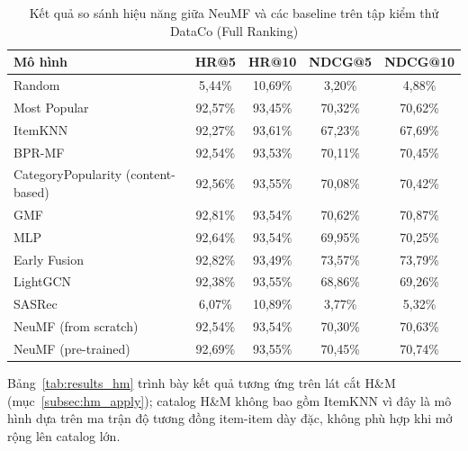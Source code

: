 \begin{table}[htbp]
    \centering
    \caption{Kết quả so sánh hiệu năng giữa NeuMF và các baseline trên tập kiểm thử DataCo (Full Ranking)}
    \label{tab:results}
    \begin{tabular}{|l|c|c|c|c|}
        \hline
        \textbf{Mô hình} & \textbf{HR@5} & \textbf{HR@10} & \textbf{NDCG@5} & \textbf{NDCG@10} \\
        \hline
        Random & 5,44\% & 10,69\% & 3,20\% & 4,88\% \\
        \hline
        Most Popular & 92,57\% & 93,45\% & 70,32\% & 70,62\% \\
        \hline
        ItemKNN & 92,27\% & 93,61\% & 67,23\% & 67,69\% \\
        \hline
        BPR-MF & 92,54\% & 93,53\% & 70,11\% & 70,45\% \\
        \hline
        CategoryPopularity (content-based) & 92,56\% & 93,55\% & 70,08\% & 70,42\% \\
        \hline
        GMF & 92,81\% & 93,54\% & 70,62\% & 70,87\% \\
        \hline
        MLP & 92,64\% & 93,54\% & 69,95\% & 70,25\% \\
        \hline
        Early Fusion & 92,82\% & 93,49\% & 73,57\% & 73,79\% \\
        \hline
        LightGCN & 92,38\% & 93,55\% & 68,86\% & 69,26\% \\
        \hline
        SASRec & 6,07\% & 10,89\% & 3,77\% & 5,32\% \\
        \hline
        NeuMF (from scratch) & 92,54\% & 93,54\% & 70,30\% & 70,63\% \\
        \hline
        NeuMF (pre-trained) & 92,69\% & 93,55\% & 70,45\% & 70,74\% \\
        \hline
    \end{tabular}
\end{table}

Bảng~\ref{tab:results_hm} trình bày kết quả tương ứng trên lát cắt H\&M (mục~\ref{subsec:hm_apply}); catalog H\&M không bao gồm ItemKNN vì đây là mô hình dựa trên ma trận độ tương đồng item-item dày đặc, không phù hợp khi mở rộng lên catalog lớn.

